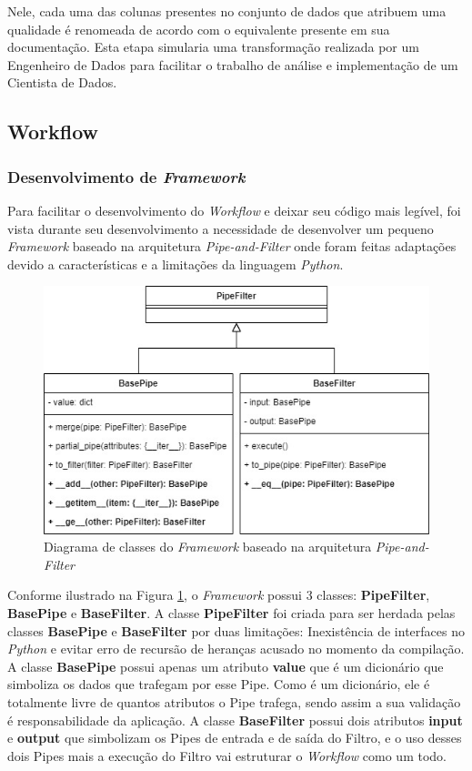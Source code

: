 \documentclass[portugues]{ic-tese}
\begin{document}
Nele, cada uma das colunas presentes no conjunto de dados que atribuem uma qualidade é renomeada de acordo com o equivalente presente em sua documentação. Esta etapa simularia uma transformação realizada por um Engenheiro de Dados para facilitar o trabalho de análise e implementação de um Cientista de Dados.

\subsection{Workflow}

\subsubsection{Desenvolvimento de \textit{Framework}}

Para facilitar o desenvolvimento do \textit{Workflow} e deixar seu código mais legível, foi vista durante seu desenvolvimento a necessidade de desenvolver um pequeno \textit{Framework} baseado na arquitetura \textit{Pipe-and-Filter} onde foram feitas adaptações devido a características e a limitações da linguagem \textit{Python}.

\begin{figure}[H]
\centering
\includegraphics[scale=0.8]{images/classdiagram_Pipe-and-Filter_framework.jpg}
\caption {Diagrama de classes do \textit{Framework} baseado na arquitetura \textit{Pipe-and-Filter}}
\label{fig:PipeAndFilterFramework}
\end{figure}

Conforme ilustrado na Figura \ref{fig:PipeAndFilterFramework}, o \textit{Framework} possui 3 classes: \textbf{PipeFilter}, \textbf{BasePipe} e \textbf{BaseFilter}. A classe \textbf{PipeFilter} foi criada para ser herdada pelas classes \textbf{BasePipe} e \textbf{BaseFilter} por duas limitações: Inexistência de interfaces no \textit{Python} e evitar erro de recursão de heranças acusado no momento da compilação. A classe \textbf{BasePipe} possui apenas um atributo \textbf{value} que é um dicionário que simboliza os dados que trafegam por esse Pipe. Como é um dicionário, ele é totalmente livre de quantos atributos o Pipe trafega, sendo assim a sua validação é responsabilidade da aplicação. A classe \textbf{BaseFilter} possui dois atributos \textbf{input} e \textbf{output} que simbolizam os Pipes de entrada e de saída do Filtro, e o uso desses dois Pipes mais a execução do Filtro vai estruturar o \textit{Workflow} como um todo.
\end{document}
